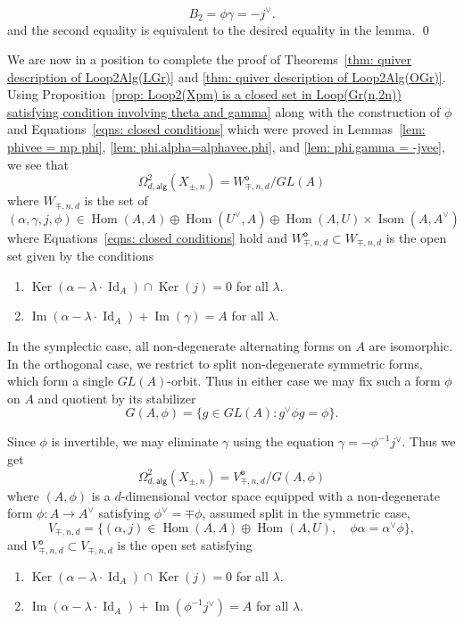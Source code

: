 \documentclass{amsart}
\theoremstyle{definition}
\newcommand{\Hom}{\operatorname{Hom}}
\newcommand{\Ker}{\operatorname{Ker}}
\newcommand{\im}{\operatorname{Im}}
\newcommand{\alg}{\mathsf{alg}}
\newcommand{\open}{\mathsf{o}}
\newcommand{\LoopTwo}{\Omega^{2}_{d,\alg}}
\newcommand{\Id}{\operatorname{Id}}
\newcommand{\Xpm}{X_{\pm,n}}
\begin{document}
\[
B_{2} = \phi\gamma  = -j^{\vee}.
\]
and the second equality is equivalent to the desired equality in the lemma.
\qed 

We are now in a position to complete the proof of Theorems~\ref{thm:
quiver description of Loop2Alg(LGr)} and \ref{thm: quiver description
of Loop2Alg(OGr)}. Using Proposition~\ref{prop: Loop2(Xpm) is a closed set in
Loop(Gr(n,2n)) satisfying condition involving theta and gamma} along
with the construction of $\phi$ and Equations~\eqref{eqns: closed
conditions} which were proved in Lemmas~\ref{lem: phivee = mp phi},
\ref{lem: phi.alpha=alphavee.phi}, and \ref{lem: phi.gamma = -jvee},
we see that 
\[
\LoopTwo (\Xpm ) = W^{\open}_{\mp,n,d} / GL(A)
\]
where $W_{\mp ,n,d}$ is the set of
\[
(\alpha ,\gamma ,j,\phi )\in \Hom (A,A)\oplus \Hom
(U^{\vee},A)\oplus  \Hom (A,U)\times \operatorname{Isom}(A,A^{\vee})
\]
where Equations~\eqref{eqns: closed conditions} hold and $W^{\open}_{\mp
,n,d}\subset W_{\mp ,n,d}$ is the open set given by the conditions

\bigskip

\begin{enumerate}
\item $\Ker (\alpha -\lambda \cdot \Id_{A})\cap \Ker (j) = 0$ for all
$\lambda$.
\item  $\im (\alpha -\lambda \cdot \Id_{A})+  \im (\gamma )=A$ for
all $\lambda$.
\end{enumerate}

\bigskip

In the symplectic case, all non-degenerate alternating forms on $A$
are isomorphic. In the orthogonal case, we restrict to split
non-degenerate symmetric forms, which form a single $GL(A)$-orbit.
Thus in either case we may fix such a form $\phi $ on $A$ and quotient
by its stabilizer
\[
G(A,\phi)=\{g\in GL(A):g^\vee \phi g=\phi\}.
\]


Since $\phi$ is invertible, we may eliminate $\gamma$ using the
equation $\gamma =-\phi^{-1} j^{\vee}$. Thus we get
\[
\LoopTwo (\Xpm ) = V_{\mp ,n,d}^{\open}/G(A,\phi )
\]
where $(A,\phi )$ is a $d$-dimensional vector space equipped with a 
non-degenerate form $\phi :A\to A^{\vee}$ satisfying $\phi^{\vee}=\mp
\phi$, assumed split in the symmetric case, 
\[
V_{\mp ,n,d} = \{(\alpha ,j)\in \Hom (A,A)\oplus \Hom (A,U),\quad \phi
\alpha =\alpha^{\vee}\phi \}, 
\]
and $V^{\open}_{\mp, n,d}\subset V_{\mp, n,d}$ is the open set satisfying

\bigskip

\begin{enumerate}
\item $\Ker (\alpha -\lambda \cdot \Id_{A})\cap \Ker (j) = 0$ for all
$\lambda$.
\item  $\im (\alpha -\lambda \cdot \Id_{A})+  \im (\phi^{-1}j^{\vee} )=A$ for
all $\lambda$.
\end{enumerate}
  
\end{document}
